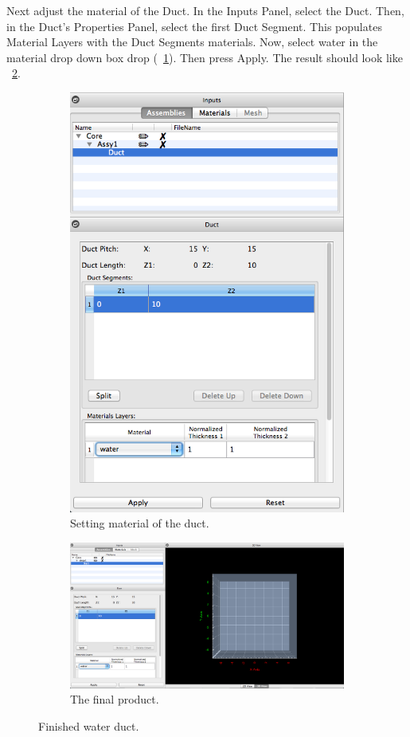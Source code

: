 Next adjust the material of the Duct.  In the Inputs Panel, select the Duct.  Then, in the Duct's Properties Panel, select the first Duct Segment.  This populates Material Layers with the Duct Segments materials.  Now, select water in the material drop down box drop (~\ref{fig:rectSetMaterial}).  Then press Apply.  The result should look like ~\ref{fig:rectDuctResult}.

\begin{figure}
\centering
\begin{subfigure}{.5\textwidth}
  \centering
  \includegraphics[width=0.7\linewidth]{Images/rect-set-material.png}
  \caption{Setting material of the duct.}
  \label{fig:rectSetMaterial}
\end{subfigure}%
\begin{subfigure}{.5\textwidth}
  \centering
  \includegraphics[width=0.9\linewidth]{Images/rect-duct-result.png}
  \caption{The final product.}
  \label{fig:rectDuctResult}
\end{subfigure}
\caption{Finished water duct.}
\label{fig:test}
\end{figure}

